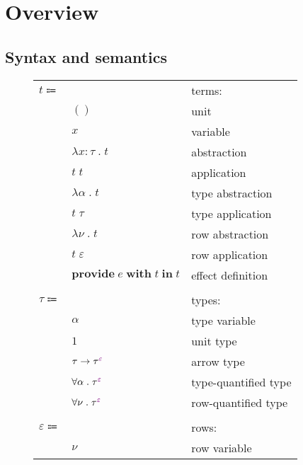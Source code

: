 \documentclass[12pt]{article}
\newcommand\anno[2]{#1 : #2}
\newcommand\term{t}
\newcommand\eunit{()}
\newcommand\evar{x}
\newcommand\eabs[2]{\lambda #1 \; . \; #2}
\newcommand\eapp[2]{#1 \; #2}
\newcommand\etabs[2]{\lambda #1 \; . \; #2}
\newcommand\etapp[2]{#1 \; #2}
\newcommand\eprovide[3]{\textbf{provide} \; #1 \; \textbf{with} \; #2 \; \textbf{in} \; #3}
\newcommand\tembellished[2]{{#1}^{\textcolor{violet}{#2}}}
\newcommand\type{\tau}
\newcommand\tvar{\alpha}
\newcommand\tunit{1}
\newcommand\tarrow[2]{#1 \rightarrow #2}
\newcommand\tforall[2]{\forall #1 \; . \; #2}
\newcommand\row{\varepsilon}
\newcommand\rvar{\nu}
\newcommand\effect{e}
\begin{document}
  \section{Overview}

    \subsection{Syntax and semantics}

      \begin{figure}[H]
        \begin{mdframed}[backgroundcolor=none]
          \begin{center}
            \begin{tabular}{l l l}
              $\term \Coloneqq $ & & terms: \\
              & $\eunit$ & unit \\
              & $\evar$ & variable \\
              & $\eabs{\anno{\evar}{\type}}{\term}$ & abstraction \\
              & $\eapp{\term}{\term}$ & application \\
              & $\etabs{\tvar}{\term}$ & type abstraction \\
              & $\etapp{\term}{\type}$ & type application \\
              & $\etabs{\rvar}{\term}$ & row abstraction \\
              & $\etapp{\term}{\row}$ & row application \\
              & $\eprovide{\effect}{\term}{\term}$ & effect definition \\
              \\
              $\type \Coloneqq$ & & types: \\
              & $\tvar$ & type variable \\
              & $\tunit$ & unit type \\
              & $\tarrow{\type}{\tembellished{\type}{\row}}$ & arrow type \\
              & $\tforall{\tvar}{\tembellished{\type}{\row}}$ & type-quantified type \\
              & $\tforall{\rvar}{\tembellished{\type}{\row}}$ & row-quantified type \\
              \\
              $\row \Coloneqq$ & & rows: \\
              & $\rvar$ & row variable \\

\end{tabular}
\end{center}
\end{mdframed}
\end{figure}
\end{document}
